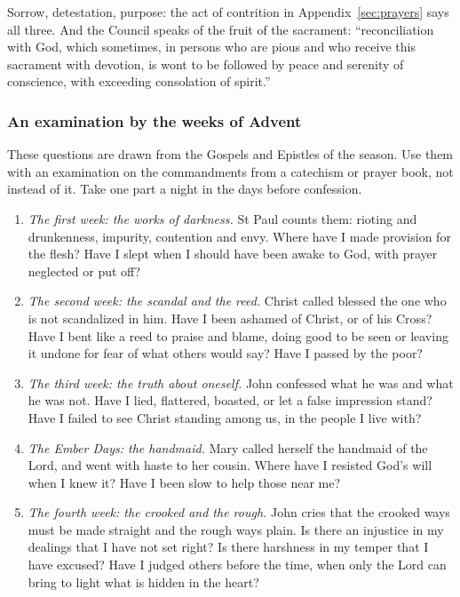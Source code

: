 Sorrow, detestation, purpose: the act of contrition in
Appendix~\ref{sec:prayers} says all three. And the Council speaks of the fruit of
the sacrament: ``reconciliation with God, which sometimes, in persons who are
pious and who receive this sacrament with devotion, is wont to be followed by
peace and serenity of conscience, with exceeding consolation of spirit.''

\subsubsection*{An examination by the weeks of Advent}

These questions are drawn from the Gospels and Epistles of the season. Use them
with an examination on the commandments from a catechism or prayer book, not
instead of it. Take one part a night in the days before confession.

\begin{enumerate}
\item \textit{The first week: the works of darkness.} St Paul counts them:
rioting and drunkenness, impurity, contention and envy. Where have I made
provision for the flesh? Have I slept when I should have been awake to God,
with prayer neglected or put off?
\item \textit{The second week: the scandal and the reed.} Christ called
blessed the one who is not scandalized in him. Have I been ashamed of Christ, or
of his Cross? Have I bent like a reed to praise and blame, doing good to be seen
or leaving it undone for fear of what others would say? Have I passed by the
poor?
\item \textit{The third week: the truth about oneself.} John confessed what he
was and what he was not. Have I lied, flattered, boasted, or let a false
impression stand? Have I failed to see Christ standing among us, in the people
I live with?
\item \textit{The Ember Days: the handmaid.} Mary called herself the handmaid
of the Lord, and went with haste to her cousin. Where have I resisted God's will
when I knew it? Have I been slow to help those near me?
\item \textit{The fourth week: the crooked and the rough.} John cries that the
crooked ways must be made straight and the rough ways plain. Is there an
injustice in my dealings that I have not set right? Is there harshness in my
temper that I have excused? Have I judged others before the time, when only the
Lord can bring to light what is hidden in the heart?
\end{enumerate}

